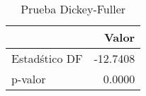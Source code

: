 \begin{table}[H]
\label{tab:dickey_fuller}
\centering
\begin{tabular}{lr}
\toprule
 & Valor \\
\midrule
Estad\'stico DF & -12.7408 \\
p-valor & 0.0000 \\
\bottomrule
\end{tabular}
\caption{Prueba Dickey-Fuller}
\end{table}
